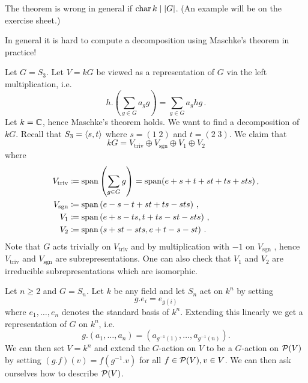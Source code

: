 \begin{warn}
  The theorem is wrong in general if $\operatorname{char} k \mid |G|$.
  (An example will be on the exercise sheet.)
\end{warn}

\begin{expl}
  In general it is hard to compute a decomposition using Maschke’s theorem in practice!
  
  Let $G = S_3$.
  Let $V = kG$ be viewed as a representation of $G$ via the left multiplication, i.e.\
  \[
      h.\left( \sum_{g \in G} a_g g \right)
    = \sum_{g \in G} a_g hg \,.
  \]
  Let $k = \mathbb{C}$, hence Maschke’s theorem holds. We want to find a decomposition of $kG$. Recall that $S_3 = \left\langle s,t \right\rangle$ where $s = (1 \; 2)$ and $t = (2 \; 3)$. We claim that
  \[
      kG
    = V_{\text{triv}} \oplus V_{\text{sgn}} \oplus V_1 \oplus V_2
  \]
  where
  \begin{align*}
                V_{\text{triv}}
    &\coloneqq  \operatorname{span}\left(\sum_{g \in G} g \right) = \operatorname{span}(e+s+t+st+ts+sts) \,,
    \\
                V_{\text{sgn}}
    &\coloneqq  \operatorname{span}\left(e-s-t+st+ts-sts\right) \,,
    \\
                V_1
    &\coloneqq  \operatorname{span}\left(e+s-ts, t+ts-st-sts\right) \,,
    \\
                V_2
    &\coloneqq  \operatorname{span}\left(s+st-sts,e+t-s-st\right) \,.
  \end{align*}
  Note that $G$ acts trivially on $V_{\text{triv}}$ and by multiplication with $-1$ on $V_{\text{sgn}}$ , hence $V_{\text{triv}}$ and $V_{\text{sgn}}$ are subrepresentations.
  One can also check that $V_1$ and $V_2$ are irreducible subrepresentations which are isomorphic.
\end{expl}


\begin{expl}
  Let $n \geq 2$ and $G = S_n$.
  Let $k$ be any field and let $S_n$ act on $k^n$ by setting
  \[
      g.e_i
    = e_{g(i)}
  \]
  where $e_1, \dotsc, e_n$ denotes the standard basis of $k^n$.
  Extending this linearly we get a representation of $G$ on $k^n$, i.e.\
  \[
    g.(a_1, \dotsc, a_n)
    = \left( a_{g^{-1}(1)}, \dotsc, a_{g^{-1}(n)} \right).
  \]
  We can then set $V = k^n$ and extend the $G$-action on $V$ to be a $G$-action on $\mathcal{P}(V)$ by setting $(g.f)(v) = f(g^{-1}.v)$ for all $f \in \mathcal{P}(V), v \in V$.
  We can then ask ourselves how to describe $\mathcal{P}(V)$.
\end{expl}


